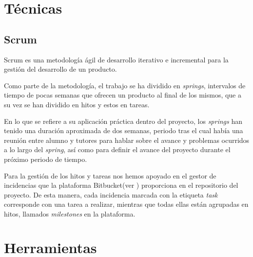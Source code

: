 

\section{Técnicas}
\subsection{Scrum}
Scrum es una metodología ágil de desarrollo iterativo e incremental para la gestión del desarrollo de un producto. \cite{wikiScrum} 

Como parte de la metodología, el trabajo se ha dividido en \textit{springs}, intervalos de tiempo de pocas semanas que ofrecen un producto al final de los mismos, que a su vez se han dividido en hitos y estos en tareas.

En lo que se refiere a su aplicación práctica dentro del proyecto, los \textit{springs} han tenido una duración aproximada de dos semanas, periodo tras el cual había una reunión entre alumno y tutores para hablar sobre el avance y problemas ocurridos a lo largo del \textit{spring}, así como para definir el avance del proyecto durante el próximo periodo de tiempo.

Para la gestión de los hitos y tareas nos hemos apoyado en el gestor de incidencias que la plataforma Bitbucket(ver ) proporciona en el repositorio del proyecto. De esta manera, cada incidencia marcada con la etiqueta \textit{task} corresponde con una tarea a realizar, mientras que todas ellas están agrupadas en hitos, llamados \textit{milestones} en la plataforma.

\section{Herramientas}

